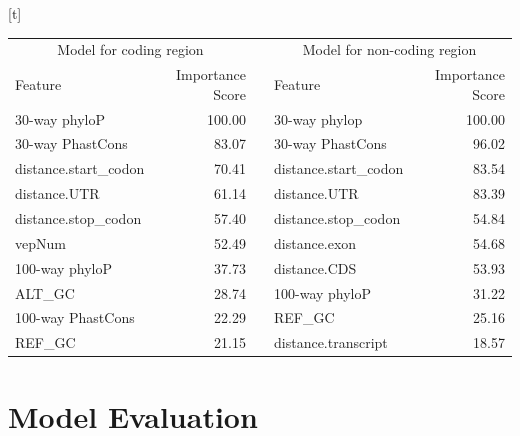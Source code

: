 \documentclass[a4paper,nohyper,nobib,openany,justified]{tufte-book}
\makeatletter
\renewenvironment{table}[1][htbp]{%
  \@tufte@orig@float{table}[#1]%
}{%
  \@tufte@orig@endfloat
}
\makeatother
\begin{document}
\begin{fullwidth}
\begin{table}[t]
        \begin{center}
        \begin{tabular}{lrclr}
        \toprule
         \multicolumn{2}{c}{Model for coding region} & &\multicolumn{2}{c}{Model for non-coding region}\\
        \cmidrule(l){1-2}
        \cmidrule(l){4-5}
        Feature & Importance Score & \quad & Feature & Importance Score \\
        \midrule
    30-way phyloP         & 100.00 &  & 30-way phylop         & 100.00 \\
    30-way PhastCons      & 83.07  &  & 30-way PhastCons      & 96.02  \\
    distance.start\_codon & 70.41  &  & distance.start\_codon & 83.54  \\
    distance.UTR          & 61.14  &  & distance.UTR          & 83.39  \\
    distance.stop\_codon  & 57.40  &  & distance.stop\_codon  & 54.84  \\
    vepNum                & 52.49  &  & distance.exon         & 54.68  \\
    100-way phyloP        & 37.73  &  & distance.CDS          & 53.93  \\
    ALT\_GC               & 28.74  &  & 100-way phyloP        & 31.22  \\
    100-way PhastCons     & 22.29  &  & REF\_GC               & 25.16  \\
    REF\_GC               & 21.15  &  & distance.transcript   & 18.57  \\
        \bottomrule
        \end{tabular}
        \end{center}
    \caption{Importance score of features for coding and non-coding regions. The scores are computed using the mean decrease in Gini of random forest classifier. Only the top 10 features are listed in the table.}
    \label{tab:ImpScore}
\end{table}

\section{Model Evaluation}


\end{fullwidth}
\end{document}
